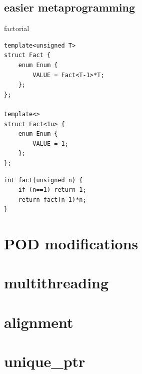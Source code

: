 \documentclass{beamer}
\begin{document}
\subsection{easier metaprogramming}
\begin{frame}{factorial}
  \begin{block}{}
\begin{verbatim}
template<unsigned T>
struct Fact {
    enum Enum {
        VALUE = Fact<T-1>*T;
    };
};

template<>
struct Fact<1u> {
    enum Enum {
        VALUE = 1;
    };
};
\end{verbatim}
  \end{block}

  \begin{block}{}
\begin{verbatim}
int fact(unsigned n) {
    if (n==1) return 1;
    return fact(n-1)*n;
}
\end{verbatim}
  \end{block}
\end{frame}

\section{POD modifications}
\section{multithreading}
\section{alignment}
\section{unique\_ptr}
\end{document}
